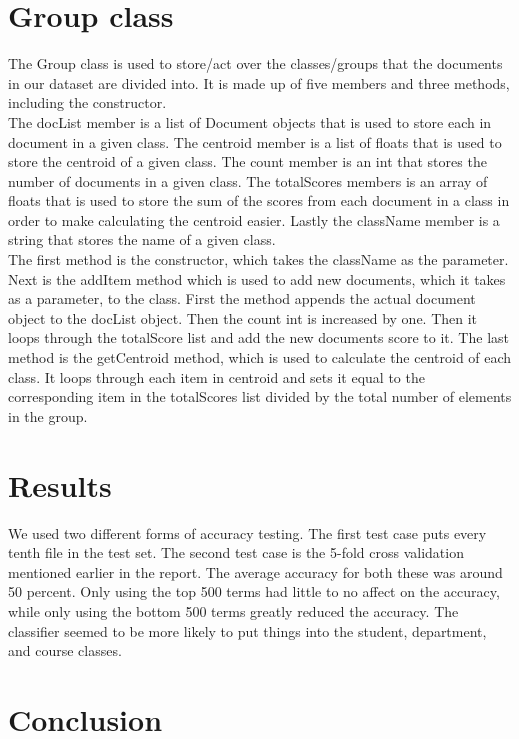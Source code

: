 \documentclass[12pt]{article}
\begin{document}
\section{Group class}
\indent The Group class is used to store/act over the classes/groups that the documents in our dataset are divided into. It is made up of five members and three methods, including the constructor. \\
\indent The docList member is a list of Document objects that is used to store each in document in a given class. The centroid member is a list of floats that is used to store the centroid of a given class. The count member is an int that stores the number of documents in a given class. The totalScores members is an array of floats that is used to store the sum of the scores from each document in a class in order to make calculating the centroid easier. Lastly the className member is a string that stores the name of a given class. \\
\indent The first method is the constructor, which takes the className as the parameter. Next is the addItem method which is used to add new documents, which it takes as a parameter, to the class. First the method appends the actual document object to the docList object. Then the count int is increased by one. Then it loops through the totalScore list and add the new documents score to it. The last method is the getCentroid method, which is used to calculate the centroid of each class. It loops through each item in centroid and sets it equal to the corresponding item in the totalScores list divided by the total number of elements in the group. \\

\section{Results}
We used two different forms of accuracy testing. The first test case puts every tenth file in the test set. The second test case is the 5-fold cross validation mentioned earlier in the report. The average accuracy for both these was around 50 percent. Only using the top 500 terms had little to no affect on the accuracy, while only using the bottom 500 terms greatly reduced the accuracy. The classifier seemed to be more likely to put things into the student, department, and course classes. 

\section{Conclusion}


\begin{thebibliography}{9}


\end{thebibliography}
\end{document}

